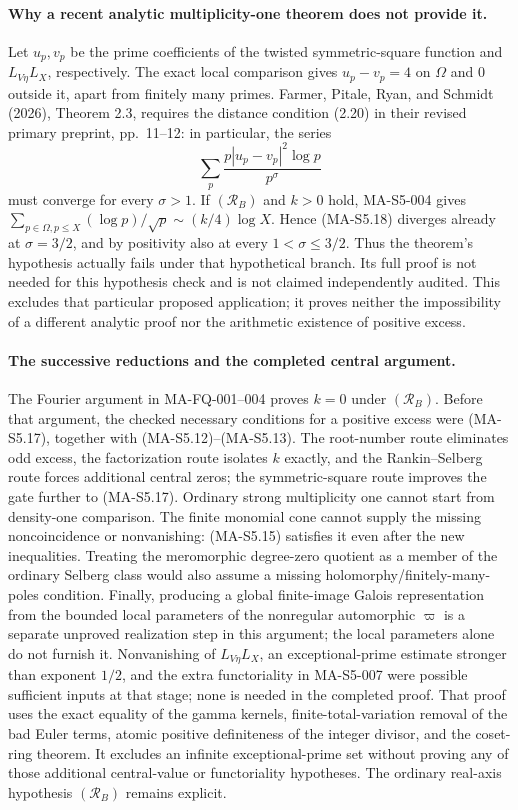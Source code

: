 \paragraph{Why a recent analytic multiplicity-one theorem does not provide it.}
Let $u_p,v_p$ be the prime coefficients of the twisted
symmetric-square function and $L_{V\eta}L_X$, respectively.
The exact local comparison gives $u_p-v_p=4$ on $\Omega$ and
$0$ outside it, apart from finitely many primes. Farmer, Pitale,
Ryan, and Schmidt (2026), Theorem 2.3, requires the distance
condition (2.20) in their revised primary preprint, pp.~11--12:
in particular, the series
\[
       \sum_p\frac{p|u_p-v_p|^2\log p}{p^\sigma}
 \tag{MA-S5.18}
\]
must converge for every $\sigma>1$. If $(\mathcal R_B)$ and
$k>0$ hold, MA-S5-004 gives
$\sum_{p\in\Omega,p\le X}(\log p)/\sqrt p
\sim(k/4)\log X$. Hence (MA-S5.18) diverges already at
$\sigma=3/2$, and by positivity also at every
$1<\sigma\le3/2$. Thus the theorem's hypothesis actually fails
under that hypothetical branch. Its full proof is not needed for this
hypothesis check and is not claimed independently audited.
This excludes that particular proposed application; it proves
neither the impossibility of a different analytic proof nor the
arithmetic existence of positive excess.

\paragraph{The successive reductions and the completed central argument.}
The Fourier argument in MA-FQ-001--004 proves $k=0$ under
$(\mathcal R_B)$. Before that argument, the checked necessary
conditions for a positive excess were (MA-S5.17), together with
(MA-S5.12)--(MA-S5.13).
The root-number route eliminates odd excess, the factorization
route isolates $k$ exactly, and the Rankin--Selberg route forces
additional central zeros; the symmetric-square route improves
the gate further to (MA-S5.17). Ordinary strong multiplicity one
cannot start from density-one comparison. The finite monomial
cone cannot supply the missing noncoincidence or nonvanishing:
(MA-S5.15) satisfies it even after the new inequalities.
Treating the meromorphic degree-zero quotient as a member of
the ordinary Selberg class would also assume a missing
holomorphy/finitely-many-poles condition. Finally, producing a
global finite-image Galois representation from the bounded local
parameters of the nonregular automorphic $\varpi$ is a separate
unproved realization step in this argument; the local parameters
alone do not furnish it. Nonvanishing of $L_{V\eta}L_X$, an
exceptional-prime estimate stronger than exponent $1/2$, and
the extra functoriality in MA-S5-007 were possible sufficient
inputs at that stage; none is needed in the completed proof.
That proof uses the exact equality of the gamma kernels,
finite-total-variation removal of the bad Euler terms, atomic
positive definiteness of the integer divisor, and the coset-ring
theorem. It excludes an infinite exceptional-prime set without
proving any of those additional central-value or functoriality
hypotheses. The ordinary real-axis hypothesis $(\mathcal R_B)$
remains explicit.


